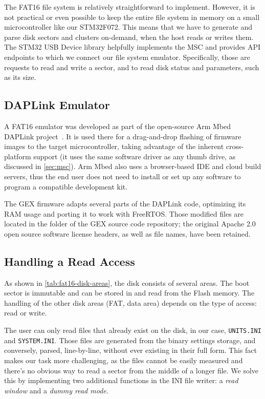 The FAT16 file system is relatively straightforward to implement. However, it is not practical or even possible to keep the entire file system in memory on a small microcontroller like our STM32F072. This means that we have to generate and parse disk sectors and clusters on-demand, when the host reads or writes them. The STM32 \gls{USB} Device library helpfully implements the \gls{MSC} and provides \gls{API} endpoints to which we connect our file system emulator. Specifically, those are requests to read and write a sector, and to read disk status and parameters, such as its size.

\subsection{DAPLink Emulator}

A FAT16 emulator was developed as part of the open-source Arm Mbed DAPLink project~\cite{daplink}. It is used there for a drag-and-drop flashing of firmware images to the target microcontroller, taking advantage of the inherent cross-platform support (it uses the same software driver as any thumb drive, as discussed in \cref{sec:msc}). Arm Mbed also uses a browser-based \gls{IDE} and cloud build servers, thus the end user does not need to install or set up any software to program a compatible development kit.

The GEX firmware adapts several parts of the DAPLink code, optimizing its \gls{RAM} usage and porting it to work with FreeRTOS. Those modified files are located in the folder  of the GEX source code repository; the original Apache 2.0 open source software license headers, as well as file names, have been retained.

\subsection{Handling a Read Access}

As shown in \cref{tab:fat16-disk-areas}, the disk consists of several areas. The boot sector is immutable and can be stored in and read from the Flash memory. The handling of the other disk areas (\gls{FAT}, data area) depends on the type of access: read or write.

The user can only read files that already exist on the disk, in our case, \verb|UNITS.INI| and \verb|SYSTEM.INI|. Those files are generated from the binary settings storage, and conversely, parsed, line-by-line, without ever existing in their full form. This fact makes our task more challenging, as the files cannot be easily measured and there's no obvious way to read a sector from the middle of a longer file. We solve this by implementing two additional functions in the INI file writer: a \textit{read window} and a \textit{dummy read mode}.

